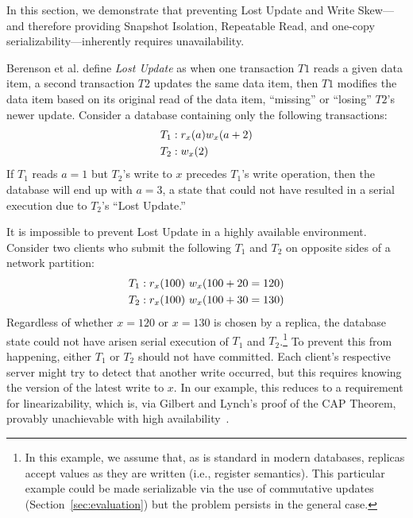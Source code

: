 In this section, we demonstrate that preventing Lost Update and Write
Skew---and therefore providing Snapshot Isolation, Repeatable Read,
and one-copy serializability---inherently requires unavailability.

Berenson et al. define \textit{Lost Update} as when one
transaction $T1$ reads a given data item, a second transaction $T2$
updates the same data item, then $T1$ modifies the data item based on
its original read of the data item, ``missing'' or ``losing'' $T2$'s
newer update. Consider a database containing only the following
transactions:
\begin{align*}
\small\vspace{-.5em}
T_1 &: r_x(a) w_x(a+2)
\\T_2 &: w_x(2)\vspace{-.5em}
\end{align*}
If $T_1$ reads $a=1$ but $T_2$'s write to $x$ precedes $T_1$'s write
operation, then the database will end up with $a=3$, a state that
could not have resulted in a serial execution due to $T_2$'s
``Lost Update.''

It is impossible to prevent Lost Update in a highly available
environment. Consider two clients who submit the following $T_1$ and
$T_2$ on opposite sides of a network partition:
\begin{align*}
\small\vspace{-.5em}
T_1 &: r_x(100)~w_x(100+20=120)
\\T_2 &: r_x(100)~w_x(100+30=130)\vspace{-.5em}
\end{align*}
Regardless of whether $x=120$ or $x=130$ is chosen by a replica, the
database state could not have arisen serial execution of $T_1$ and
$T_2$.\footnote{In this example, we assume that, as is standard in
  modern databases, replicas accept values as they are written (i.e.,
  register semantics). This particular example could be made
  serializable via the use of commutative updates
  (Section~\ref{sec:evaluation}) but the problem persists in the
  general case.}  To prevent this from happening, either $T_1$ or
$T_2$ should not have committed. Each client's respective server might
try to detect that another write occurred, but this requires knowing
the version of the latest write to $x$. In our example, this reduces
to a requirement for linearizability, which is, via Gilbert and
Lynch's proof of the CAP Theorem, provably unachievable with high
availability~\cite{gilbert-cap}.

